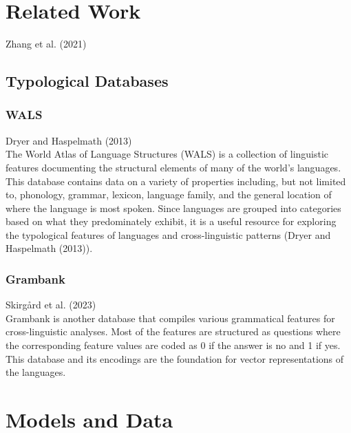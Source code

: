 \documentclass[
  letterpaper,
  DIV=11,
  numbers=noendperiod]{scrreprt}
\begin{document}

\chapter{Related Work}\label{related-work}

Zhang et al. (2021)

\section{Typological Databases}\label{typological-databases}

\subsection{WALS}\label{wals}

Dryer and Haspelmath (2013)\\
The World Atlas of Language Structures (WALS) is a collection of
linguistic features documenting the structural elements of many of the
world's languages. This database contains data on a variety of
properties including, but not limited to, phonology, grammar, lexicon,
language family, and the general location of where the language is most
spoken. Since languages are grouped into categories based on what they
predominately exhibit, it is a useful resource for exploring the
typological features of languages and cross-linguistic patterns (Dryer
and Haspelmath (2013)).

\subsection{Grambank}\label{grambank}

Skirgård et al. (2023)\\
Grambank is another database that compiles various grammatical features
for cross-linguistic analyses. Most of the features are structured as
questions where the corresponding feature values are coded as 0 if the
answer is no and 1 if yes. This database and its encodings are the
foundation for vector representations of the languages.


\chapter{Models and Data}\label{models-and-data}

\end{document}
